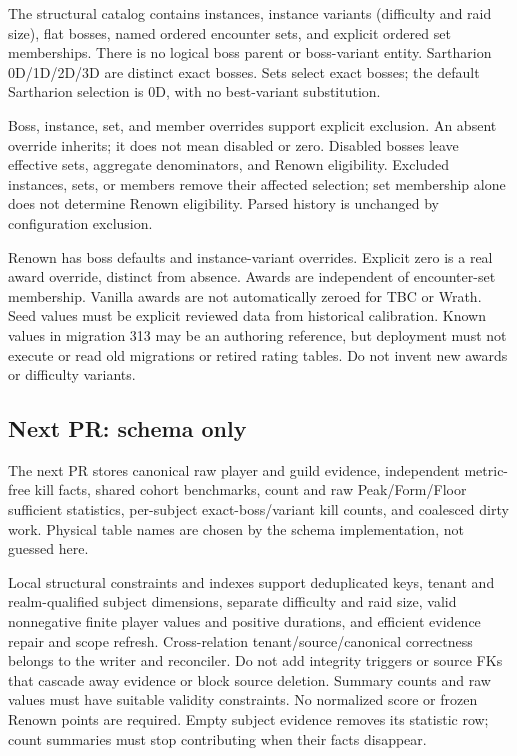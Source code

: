 \documentclass[11pt]{article}
\begin{document}
The structural catalog contains instances, instance variants (difficulty and raid size), flat bosses, named ordered encounter sets, and explicit ordered set memberships. There is no logical boss parent or boss-variant entity. Sartharion 0D/1D/2D/3D are distinct exact bosses. Sets select exact bosses; the default Sartharion selection is 0D, with no best-variant substitution.

Boss, instance, set, and member overrides support explicit exclusion. An absent override inherits; it does not mean disabled or zero. Disabled bosses leave effective sets, aggregate denominators, and Renown eligibility. Excluded instances, sets, or members remove their affected selection; set membership alone does not determine Renown eligibility. Parsed history is unchanged by configuration exclusion.

Renown has boss defaults and instance-variant overrides. Explicit zero is a real award override, distinct from absence. Awards are independent of encounter-set membership. Vanilla awards are not automatically zeroed for TBC or Wrath. Seed values must be explicit reviewed data from historical calibration. Known values in migration 313 may be an authoring reference, but deployment must not execute or read old migrations or retired rating tables. Do not invent new awards or difficulty variants.

\subsection{Next PR: schema only}
The next PR stores canonical raw player and guild evidence, independent metric-free kill facts, shared cohort benchmarks, count and raw Peak/Form/Floor sufficient statistics, per-subject exact-boss/variant kill counts, and coalesced dirty work. Physical table names are chosen by the schema implementation, not guessed here.

Local structural constraints and indexes support deduplicated keys, tenant and realm-qualified subject dimensions, separate difficulty and raid size, valid nonnegative finite player values and positive durations, and efficient evidence repair and scope refresh. Cross-relation tenant/source/canonical correctness belongs to the writer and reconciler. Do not add integrity triggers or source FKs that cascade away evidence or block source deletion. Summary counts and raw values must have suitable validity constraints. No normalized score or frozen Renown points are required. Empty subject evidence removes its statistic row; count summaries must stop contributing when their facts disappear.
\end{document}
